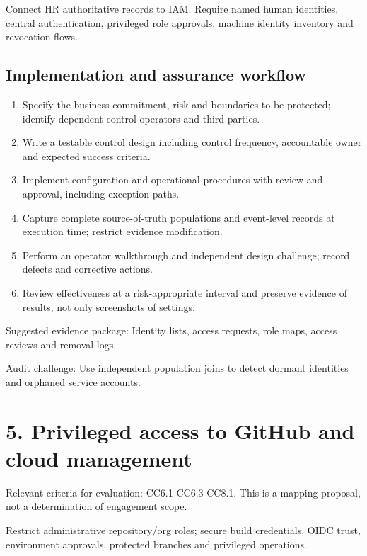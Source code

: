 \documentclass[10pt,oneside]{report}
\begin{document}
\begin{engineeringbox}
Connect HR authoritative records to IAM. Require named human identities, central authentication, privileged role approvals, machine identity inventory and revocation flows.
\end{engineeringbox}
\subsection{Implementation and assurance workflow}
\begin{enumerate}
\item Specify the business commitment, risk and boundaries to be protected; identify dependent control operators and third parties.
\item Write a testable control design including control frequency, accountable owner and expected success criteria.
\item Implement configuration and operational procedures with review and approval, including exception paths.
\item Capture complete source-of-truth populations and event-level records at execution time; restrict evidence modification.
\item Perform an operator walkthrough and independent design challenge; record defects and corrective actions.
\item Review effectiveness at a risk-appropriate interval and preserve evidence of results, not only screenshots of settings.
\end{enumerate}

Suggested evidence package: Identity lists, access requests, role maps, access reviews and removal logs.

Audit challenge: Use independent population joins to detect dormant identities and orphaned service accounts.

\section{5. Privileged access to GitHub and cloud management}
Relevant criteria for evaluation: CC6.1 CC6.3 CC8.1. This is a mapping proposal, not a determination of engagement scope.

\begin{engineeringbox}
Restrict administrative repository/org roles; secure build credentials, OIDC trust, environment approvals, protected branches and privileged operations.
\end{engineeringbox}
\end{document}
